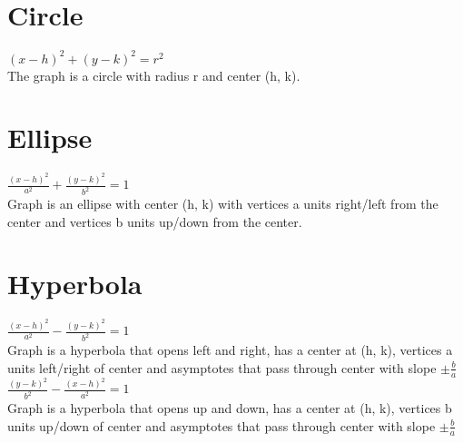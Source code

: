 \documentclass[10pt,onecolumn]{article}
\begin{document}
\section{Circle}
\((x - h)^2 + (y - k)^2 = r^2  \) \\
The graph is a circle with radius r and center (h, k).

\section{Ellipse}
\(\frac{(x - h)^2}{a^2} + \frac{(y - k)^2}{b^2} = 1\)  \\
Graph is an ellipse with center (h, k) with vertices a units right/left from the center and vertices b units up/down from the center.

\section{Hyperbola}
\(\frac{(x - h)^2}{a^2} - \frac{(y - k)^2}{b^2} = 1\)  \\
Graph is a hyperbola that opens left and right, has a center at (h, k), vertices a units left/right of center and asymptotes that pass through center with slope \(\pm \frac{b}{a}\) \\
\(\frac{(y - k)^2}{b^2} - \frac{(x - h)^2}{a^2} = 1\)  \\
Graph is a hyperbola that opens up and down, has a center at (h, k), vertices b units up/down of center and asymptotes that pass through center with slope \(\pm \frac{b}{a}\) \\

\end{document}
